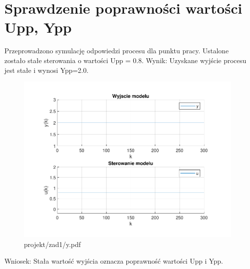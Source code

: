 \section{Sprawdzenie poprawności wartości Upp, Ypp}

Przeprowadzono symulację odpowiedzi procesu dla punktu pracy. 
Ustalone zostało stałe sterowania o wartości Upp = \num{0,8}.
Wynik: 
Uzyskane wyjście procesu jest stałe i wynosi Ypp=\num{2.0}.

\begin{figure}[H]
    \centering
    \includegraphics[scale=0.7]{../projekt/zad1/y.pdf}
    \caption{projekt/zad1/y.pdf}
\end{figure}

Wniosek: 
Stała wartość wyjścia oznacza poprawność wartości Upp i Ypp.

